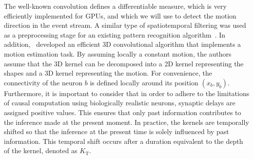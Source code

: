 \documentclass[default]{sn-jnl}%
\theoremstyle{thmstyleone}%
\theoremstyle{thmstyletwo}%
\theoremstyle{thmstylethree}%
\newcommand{\postsynaddr}{b} %
\newcommand{\Ktime}{K_\text{T}}
\begin{document}
The well-known convolution defines a differentiable measure, which is very efficiently implemented for GPUs, and which we will use to detect the motion direction in the event stream. %
A similar type of spatiotemporal filtering was used as a preprocessing stage for an existing pattern recognition algorithm~\citep{ghosh_spatiotemporal_2019}. In addition,~\citet{sekikawa_constant_2018} developed an efficient 3D convolutional algorithm that implements a motion estimation task. By assuming locally a constant motion, the authors assume that the 3D kernel can be decomposed into a 2D kernel representing the shapes and a 3D kernel representing the motion.  For convenience, the connectivity of the neuron $\postsynaddr$ is defined locally around its position $(x_\postsynaddr, y_\postsynaddr)$. Furthermore, it is important to consider that in order to adhere to the limitations of causal computation using biologically realistic neurons, synaptic delays are assigned positive values. This ensures that only past information contributes to the inference made at the present moment. In practice, the kernels are temporally shifted so that the inference at the present time is solely influenced by past information. This temporal shift occurs after a duration equivalent to the depth of the kernel, denoted as $\Ktime$. 
\end{document}
